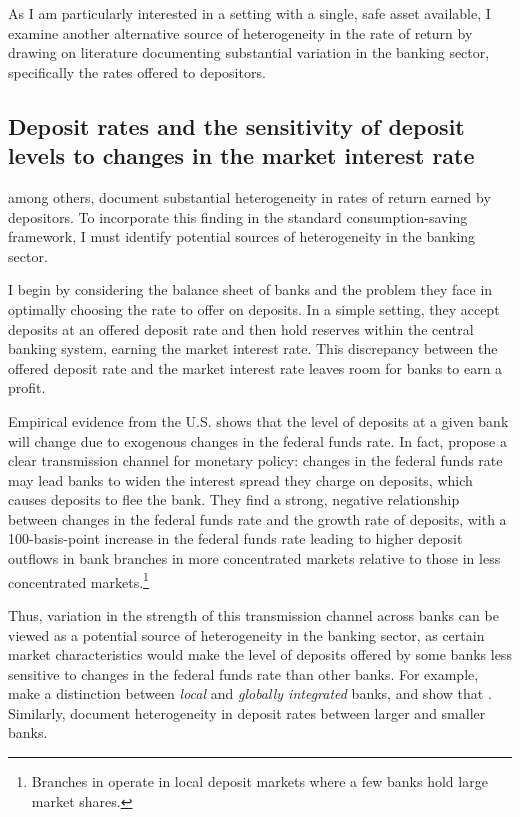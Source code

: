 \par As I am particularly interested in a setting with a single, safe asset available, I examine another alternative source of heterogeneity in the rate of return by drawing on literature documenting substantial variation in the banking sector, specifically the rates offered to depositors.

\subsection{Deposit rates and the sensitivity of deposit levels to changes in the market interest rate}

\par \cite{Deuflhard2018} among others, document substantial heterogeneity in rates of return earned by depositors. To incorporate this finding in the standard consumption-saving framework, I must identify potential sources of heterogeneity in the banking sector.

\par I begin by considering the balance sheet of banks  and the problem they face in optimally choosing the rate to offer on deposits. In a simple setting, they accept deposits at an offered deposit rate and then hold reserves within the central banking system, earning the market interest rate. This discrepancy between the offered deposit rate and the market interest rate leaves room for banks to earn a profit.

\par Empirical evidence from the U.S. shows that the level of deposits at a given bank will change due to exogenous changes in the federal funds rate. In fact, \cite{Drechsler2017} propose a clear transmission channel for monetary policy: changes in the federal funds rate may lead banks to widen the interest spread they charge on deposits, which causes deposits to flee the bank. They find a strong, negative relationship between changes in the federal funds rate and the growth rate of deposits, with a 100-basis-point increase in the federal funds rate leading to higher deposit outflows in bank branches in more concentrated markets relative to those in less concentrated markets.\footnote{Branches in  operate in local deposit markets where a few banks hold large market shares.}

\par Thus, variation in the strength of this transmission channel across banks can be viewed as a potential source of heterogeneity in the banking sector, as certain market characteristics would make the level of deposits offered by some banks less sensitive to changes in the federal funds rate than other banks. For example, \cite{Sarkisyan2021} make a distinction between \textit{local} and \textit{globally integrated} banks, and show that . Similarly, \cite{dAvernas2024} document heterogeneity in deposit rates between larger and smaller banks.

